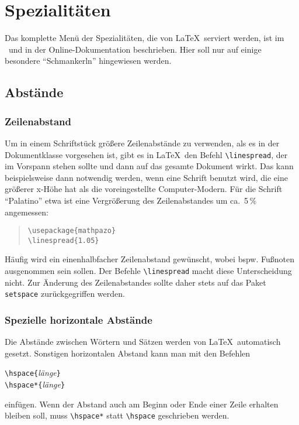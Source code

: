 

\section{Spezialitäten}
 
Das komplette Menü der Spezialitäten, die von \LaTeX\ serviert
werden, ist im \manual\ und in der Online-Dokumentation beschrieben.
Hier soll nur auf einige besondere "`Schmankerln"' hingewiesen
werden.
 
\subsection{Abstände}

\subsubsection{Zeilenabstand}

Um in einem Schriftstück größere Zeilenabstände zu verwenden,
als es in der Dokumentklasse vorgesehen ist, gibt es in
\LaTeX\ den Befehl \lstinline:\linespread:, der im Vorspann stehen sollte
und dann auf das gesamte Dokument wirkt.  Das kann beispielsweise
dann notwendig werden, wenn eine Schrift benutzt wird, die eine größerer x-Höhe 
hat als die voreingestellte Computer-Modern.  Für die Schrift "`Palatino"' etwa
ist eine Vergrößerung des Zeilenabstandes um ca.\ 5\,\% angemessen:
\begin{quote}
\lstinline|\usepackage{mathpazo}|\\
\lstinline|\linespread{1.05}|
\end{quote}

Häufig wird ein einenhalbfacher Zeilenabstand gewünscht, wobei bspw. Fußnoten ausgenommen
sein sollen. Der Befehle \lstinline:\linespread: macht diese Unterscheidung nicht. Zur
Änderung des Zeilenabstandes sollte daher stets auf das Paket \texttt{setspace} zurückgegriffen werden.
 
 
 
\subsubsection{Spezielle horizontale Abstände}\label{abst:horiz}
 
Die Abstände zwischen Wörtern und Sätzen werden von \LaTeX\ 
automatisch gesetzt.
Sonstigen horizontalen Abstand kann man mit den Befehlen
\begin{beispiel}
\lstinline|\hspace{|\textit{länge}\lstinline|}|\\
\lstinline|\hspace*{|\textit{länge}\lstinline|}|
\end{beispiel}
einfügen. Wenn der Abstand auch am Beginn oder Ende einer Zeile
erhalten bleiben soll, muss \lstinline|\hspace*| statt \lstinline|\hspace|
geschrieben werden.

